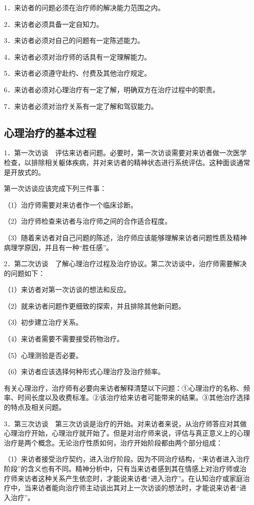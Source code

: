 1．来访者的问题必须在治疗师的解决能力范围之内。

2．来访者必须具备一定自知力。

3．来访者必须对自己的问题有一定陈述能力。

4．来访者必须对治疗师的话具有一定理解能力。

5．来访者必须遵守赴约、付费及其他治疗规定。

6．来访者必须对心理治疗有一定了解，明确双方在治疗过程中的职责。

7．来访者必须对治疗关系有一定了解和驾驭能力。

\subsection{心理治疗的基本过程}

1．第一次访谈　评估来访者问题。必要时，第一次访谈需要对来访者做一次医学检查，以排除相关躯体疾病，并对来访者的精神状态进行系统评估。这种面谈通常是开放式的。

第一次访谈应该完成下列三件事：

（1）治疗师需要对来访者作一个临床诊断。

（2）治疗师检查来访者与治疗师之间的合作适合程度。

（3）随着来访者对自己问题的陈述，治疗师应该能够理解来访者问题性质及精神病理学原因，并且有一种“胜任感”。

2．第二次访谈　了解心理治疗过程及治疗协议。第二次访谈中，治疗师需要解决的问题如下：

（1）来访者对第一次访谈的想法和反应。

（2）就来访者问题作更细致的探索，并且排除其他新问题。

（3）初步建立治疗关系。

（4）来访者需要不需要接受药物治疗。

（5）心理测验是否必要。

（6）来访者应该选择何种形式心理治疗及治疗频率。

有关心理治疗，治疗师有必要向来访者解释清楚以下问题：①心理治疗的名称、频率、时间长度以及收费标准。②该治疗给来访者可能带来的结果。③其他治疗选择的特点及相关问题。

3．第三次访谈　第三次访谈是治疗的开始。对来访者来说，从治疗师答应对其做心理治疗开始，心理治疗就开始了。但是对治疗师来说，评估与真正意义上的心理治疗是两个概念。无论治疗性质如何，治疗开始阶段都由两个部分组成：

（1）来访者接受治疗契约，进入治疗阶段。因为不同治疗结构，“来访者进入治疗阶段”的含义也有不同。精神分析中，只有当来访者感到其在情感上对治疗师或治疗师来访者这种关系产生依恋时，才能说来访者“进入治疗”。在认知治疗或家庭治疗中，当来访者能向治疗师主动谈出其对上一次访谈的想法时，才能说来访者“进入治疗”。

